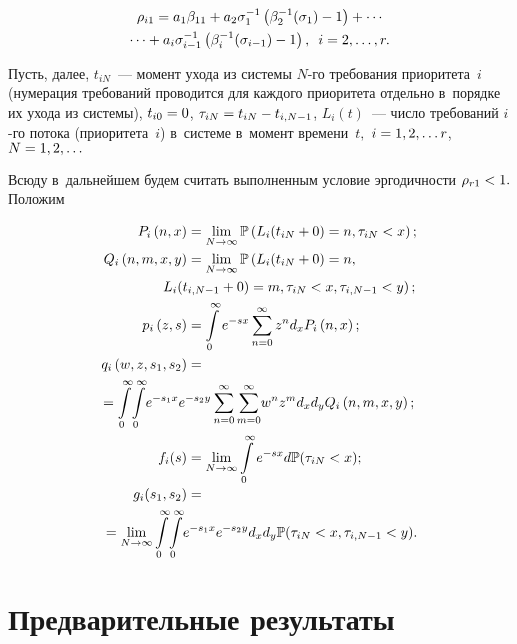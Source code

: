 \begin{multicols}{2}
  \vspace*{-13pt}
  
  \noindent
  \begin{multline*}
   \rho_{i1}=a_1\beta_{11}+a_2\sigma_1^{-1}
  \left(\beta_2^{-1}(\sigma_1)-1\right)+\cdots\\
  \cdots +
  a_i\sigma_{i-1}^{-1}\left(\beta_i^{-1}(\sigma_{i-1})-1\right),\enskip i=2,\ldots,r.
 \end{multline*}
 
\noindent
Пусть, далее, $t_{iN}$~--- момент ухода из системы \mbox{$N$-го} требования приоритета~$i$ 
(нумерация требований проводится для каждого приоритета отдельно в~порядке их 
ухода из системы), $t_{i0}\hm=0$, $\tau_{iN}\hm=t_{iN}\hm-t_{i,N-1}$, $L_i(t)$~--- 
число требований $i$-го потока (приоритета~$i$) в~системе в~момент времени~$t,$
$i\hm=1,2,\ldots r$, $N\hm=1,2,\ldots$

Всюду в~дальнейшем будем считать выполненным условие эргодичности $\rho_{r1}\hm<1.$
Положим

\noindent
\begin{align*}
P_i\left(n,x\right)&=\lim\limits_{N\rightarrow\infty}\P\left(L_i(t_{iN}+0)=n,\tau_{iN}<x\right);
\\
Q_i\left(n,m,x,y\right)&=\lim\limits_{N\rightarrow\infty}\P\left(L_i(t_{iN}+0)=n,\right.\\
&\hspace*{-20pt}\left.L_i(t_{i,N-1}+0)=m,\tau_{iN}<x,\tau_{i,N-1}<y\right);
\\
p_i\left(z,s\right)&=\int\limits_0^{\infty}e^{-sx}\sum\limits_{n=0}^{\infty}
z^{n}d_xP_i\left(n,x\right);
\\
q_i\left(w,z,s_1,s_2\right)&={}\\
&\hspace*{-63pt}{}=\int\limits_0^{\infty}\!\int\limits_0^{\infty}\!e^{-s_1x}e^{-s_2y}
\sum\limits_{n=0}^{\infty}\sum\limits_{m=0}^{\infty}\!w^{n}z^{m}d_xd_yQ_i\left(n,m,x,y\right);
\\
f_i(s)&=\lim\limits_{N\rightarrow\infty}\int\limits_0^{\infty}e^{-sx}d\P(\tau_{iN}<x);
\\[-2pt]
g_i(s_1,s_2)&={}\\
&\hspace*{-61pt}{}=\lim\limits_{N\rightarrow\infty}\int\limits_0^{\infty}\!\int\limits_0^{\infty}\!
e^{-s_1x}e^{-s_2y}d_xd_y
\P(\tau_{iN}<x,\tau_{i,N-1}<y).
\end{align*}

\section{Предварительные результаты}


\end{multicols}

